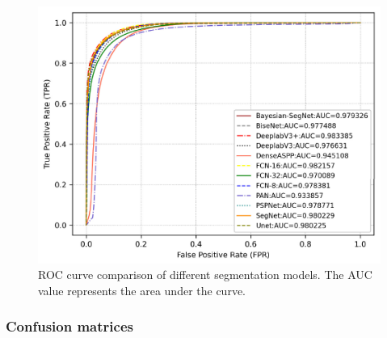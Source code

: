 \documentclass[amt, article]{copernicus}
\begin{document}
\begin{figure}[t]
	\includegraphics[width=\hsize]{figures/roc_curve.png}
	\caption{ROC curve comparison of different segmentation models. The AUC value represents the area under the curve.}
    \label{fig:roc_curve}
\end{figure}

\subsubsection{Confusion matrices}
\end{document}
